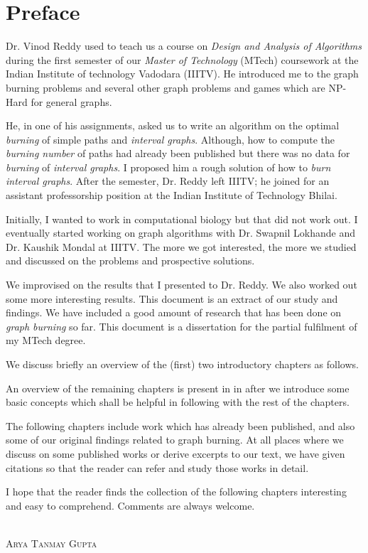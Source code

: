 \chapter*{Preface}

Dr. Vinod Reddy used to teach us a course on \textit{Design and Analysis of Algorithms} during the first semester of our \textit{Master of Technology} (MTech) coursework at the Indian Institute of technology Vadodara (IIITV). He introduced me to the graph burning problems and several other graph problems and games which are NP-Hard for general graphs.

He, in one of his assignments, asked us to write an algorithm on the optimal \textit{burning} of simple paths and \textit{interval graphs}. Although, how to compute the \textit{burning number} of paths had already been published but there was no data for \textit{burning} of \textit{interval graphs}. I proposed him a rough solution of how to \textit{burn} \textit{interval graphs}. After the semester, Dr. Reddy left IIITV; he joined for an assistant professorship position at the Indian Institute of Technology Bhilai.

Initially, I wanted to work in computational biology but that did not work out. I eventually started working on graph algorithms with Dr. Swapnil Lokhande and Dr. Kaushik Mondal at IIITV. The more we got interested, the more we studied and discussed on the problems and prospective solutions.

We improvised on the results that I presented to Dr. Reddy. We also worked out some more interesting results. This document is an extract of our study and findings. We have included a good amount of research that has been done on \textit{graph burning} so far. This document is a dissertation for the partial fulfilment of my MTech degree.

We discuss briefly an overview of the (first) two introductory chapters as follows.

An overview of the remaining chapters is present in  in  after we introduce some basic concepts which shall be helpful in following with the rest of the chapters.

The following chapters include work which has already been published, and also some of our original findings related to graph burning. At all places where we discuss on some published works or derive excerpts to our text, we have given citations so that the reader can refer and study those works in detail.

I hope that the reader finds the collection of the following chapters interesting and easy to comprehend. Comments are always welcome.\\~\\

\begin{flushright}
\textsc{Arya Tanmay Gupta}
\end{flushright}